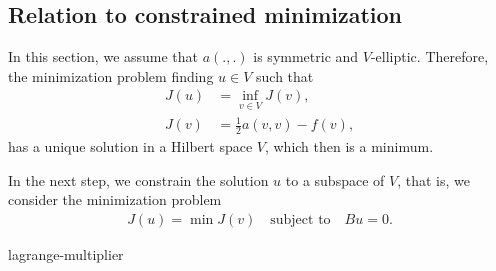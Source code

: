 \subsection{Relation to constrained minimization}

\begin{intro}
  In this section, we assume that $a(.,.)$ is symmetric and
  $V$-elliptic. Therefore, the minimization problem finding $u\in V$
  such that
  \begin{align*}
    J(u) &=\inf_{v\in V} J(v), \\
    J(v) &= \tfrac12 a(v,v) - f(v),
  \end{align*}
  has a unique solution in a Hilbert space $V$, which then is a
  minimum.

  In the next step, we constrain the solution $u$ to a subspace of
  $V$, that is, we consider the minimization problem
  \begin{gather*}
    J(u) =\min J(v) \quad
    \text{subject to}\quad
    Bu = 0.
  \end{gather*}
\end{intro}

\begin{Theorem}{lagrange-multiplier}
  
\end{Theorem}


